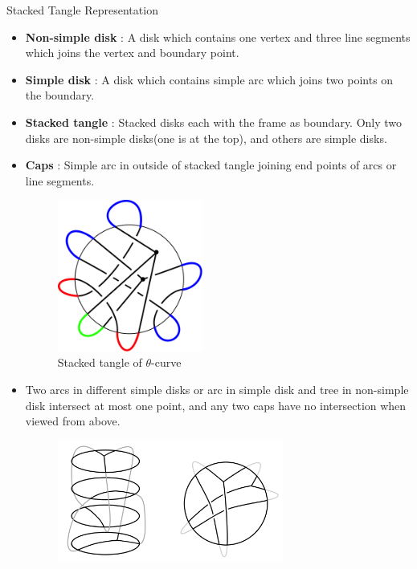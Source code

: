\documentclass[final]{beamer}
\begin{document}
\begin{frame}[t]
\begin{columns}[t]
  \begin{block}{Stacked Tangle Representation}
    \begin{itemize}
      \item \textbf{Non-simple disk} : A disk which contains one vertex and three line segments which joins the vertex and boundary point. 
      \item \textbf{Simple disk} : A disk which contains simple arc which joins two points on the boundary.
      \item \textbf{Stacked tangle} : Stacked disks each with the frame as boundary. Only two disks are non-simple disks(one is at the top), and others are simple disks. \\
      \item \textbf{Caps} : Simple arc in outside of stacked tangle joining end points of arcs or line segments. \\
      \begin{figure}
        \centering
        \includegraphics[width=0.45\textwidth]{figure/stacked_theta.png}
        \caption{Stacked tangle of $\theta$-curve}
      \end{figure}
      \item Two arcs in different simple disks or arc in simple disk and tree in non-simple disk intersect at most one point, and any two caps have no intersection when viewed from above.
      \begin{figure}
        \centering
        \includegraphics[width=0.7\textwidth]{figure/stacked_tangle.png}

\end{figure}
\end{itemize}
\end{block}
\end{columns}
\end{frame}
\end{document}
